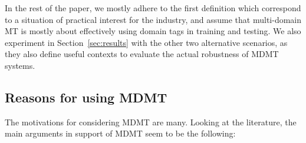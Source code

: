 \documentclass[11pt]{article}
\newcommand{\jcDone}[1]{\done[JC]\Todo[JC:]{\textcolor{blue}{#1}}}
\begin{document}
In the rest of the paper, we mostly adhere to the first definition which correspond to a situation of practical interest for the industry, and assume that multi-domain MT is mostly about effectively using domain tags in training and testing. We also experiment in Section~\ref{sec:results} with the other two alternative scenarios, as they also define useful contexts to evaluate the actual robustness of MDMT systems.

\jcDone{...a very common scenario in MT industry where clients dispose of mulitiple data corresponding to different domains (differing in genre, thematic, register, style, etc.). }

\subsection{Reasons for using MDMT \label{ssec:whymdmt}}
The motivations for considering MDMT are many. Looking at the literature, the main arguments in support of MDMT seem to be the following:
\end{document}
